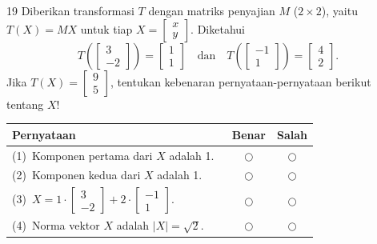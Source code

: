 \documentclass[11pt]{article}
\begin{document}
\begin{soal}{19}
Diberikan transformasi $T$ dengan matriks penyajian $M$ ($2\times2$),
yaitu $T(X)=MX$ untuk tiap $X=\begin{bmatrix}x\\y\end{bmatrix}$.
Diketahui
\[
  T\!\left(\begin{bmatrix}3\\-2\end{bmatrix}\right)=\begin{bmatrix}1\\1\end{bmatrix}
  \quad\text{dan}\quad
  T\!\left(\begin{bmatrix}-1\\1\end{bmatrix}\right)=\begin{bmatrix}4\\2\end{bmatrix}.
\]
Jika $T(X)=\begin{bmatrix}9\\5\end{bmatrix}$, tentukan kebenaran
pernyataan-pernyataan berikut tentang $X$!

\par\smallskip
{\renewcommand{\arraystretch}{1.4}%
\begin{tabular}{@{}p{0.76\linewidth}cc@{}}
\hline
\textbf{Pernyataan} & \textbf{Benar} & \textbf{Salah}\\
\hline
(1)~Komponen pertama dari $X$ adalah 1.
  & $\bigcirc$ & $\bigcirc$\\
(2)~Komponen kedua dari $X$ adalah 1.
  & $\bigcirc$ & $\bigcirc$\\
(3)~$X=1\cdot\begin{bmatrix}3\\-2\end{bmatrix}+2\cdot\begin{bmatrix}-1\\1\end{bmatrix}$.
  & $\bigcirc$ & $\bigcirc$\\
(4)~Norma vektor $X$ adalah $|X|=\sqrt{2}$.
  & $\bigcirc$ & $\bigcirc$\\
\hline
\end{tabular}}
\end{soal}
\end{document}
